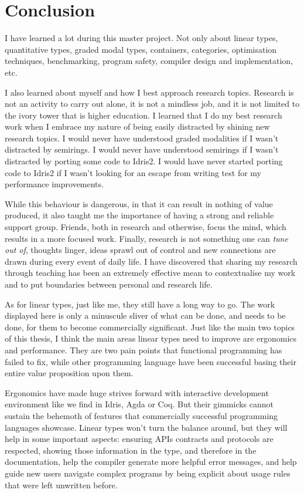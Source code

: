 \documentclass[
]{article}
\begin{document}
\newpage

\hypertarget{conclusion}{%
\section{Conclusion}\label{conclusion}}

I have learned a lot during this master project. Not only about linear
types, quantitative types, graded modal types, containers, categories,
optimisation techniques, benchmarking, program safety, compiler design
and implementation, etc.

I also learned about myself and how I best approach research topics.
Research is not an activity to carry out alone, it is not a mindless
job, and it is not limited to the ivory tower that is higher education.
I learned that I do my best research work when I embrace my nature of
being easily distracted by shining new research topics. I would never
have understood graded modalities if I wasn't distracted by semirings. I
would never have understood semirings if I wasn't distracted by porting
some code to Idris2. I would have never started porting code to Idris2
if I wasn't looking for an escape from writing test for my performance
improvements.

While this behaviour is dangerous, in that it can result in nothing of
value produced, it also taught me the importance of having a strong and
reliable support group. Friends, both in research and otherwise, focus
the mind, which results in a more focused work. Finally, research is not
something one can \emph{tune out of}, thoughts linger, ideas sprawl out
of control and new connections are drawn during every event of daily
life. I have discovered that sharing my research through teaching has
been an extremely effective mean to contextualise my work and to put
boundaries between personal and research life.

As for linear types, just like me, they still have a long way to go. The
work displayed here is only a minuscule sliver of what can be done, and
needs to be done, for them to become commercially significant. Just like
the main two topics of this thesis, I think the main areas linear types
need to improve are ergonomics and performance. They are two pain points
that functional programming has failed to fix, while other programming
language have been successful basing their entire value proposition upon
them.

Ergonomics have made huge strives forward with interactive development
environment like we find in Idris, Agda or Coq. But their gimmicks
cannot sustain the behemoth of features that commercially successful
programming languages showcase. Linear types won't turn the balance
around, but they will help in some important aspects: ensuring APIs
contracts and protocols are respected, showing those information in the
type, and therefore in the documentation, help the compiler generate
more helpful error messages, and help guide new users navigate complex
programs by being explicit about usage rules that were left unwritten
before.
\end{document}
